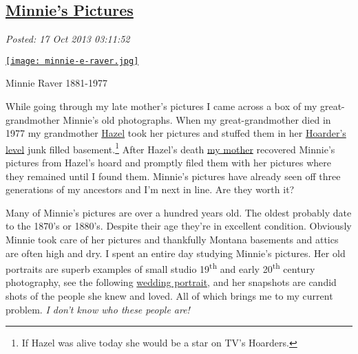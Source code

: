 %

\subsection*{\href{http://bakerjd99.wordpress.com/2013/10/16/minnies-pictures/}{Minnie's Pictures}}


\noindent\emph{Posted: 17 Oct 2013 03:11:52}
\vspace{6pt}



\captionsetup[floatingfigure]{labelformat=empty}
\begin{floatingfigure}[l]{0.29\textwidth}
\centering
\href{http://conceptcontrol.smugmug.com/People/Minnie-Raver/i-k6pnSJ4/A}{\texttt{[image: minnie-e-raver.jpg]}}
\caption{Minnie Raver 1881-1977}
\label{fig:4230X0}
\end{floatingfigure} While going through my late mother's pictures I came across a box of my
great-grandmother Minnie's old photographs. When my great-grandmother
died in 1977 my grandmother
\href{http://conceptcontrol.smugmug.com/People/Grandparents-1/i-PBjmr7p/A}{Hazel}
took her pictures and stuffed them in her
\href{http://www.aetv.com/hoarders/}{Hoarder's level} junk filled
basement.\footnote{
If Hazel was alive today she would be a star on TV's Hoarders.
} After Hazel's death
\href{http://conceptcontrol.smugmug.com/People/The-Way-We-Were/i-Z64DmrR/A}{my
mother} recovered Minnie's pictures from Hazel's hoard and promptly
filed them with her pictures where they remained until I found them.
Minnie's pictures have already seen off three generations of my
ancestors and I'm next in line. Are they worth it?

Many of Minnie's pictures are over a hundred years old. The oldest
probably date to the 1870's or 1880's. Despite their age they're in
excellent condition. Obviously Minnie took care of her pictures and
thankfully Montana basements and attics are often high and dry. I spent
an entire day studying Minnie's pictures. Her old portraits are superb
examples of small studio 19\textsuperscript{th} and early
20\textsuperscript{th} century photography, see the following
\href{https://familysearch.org/pal:/MM9.1.1/F3SR-Q8S}{wedding portrait},
and her snapshots are candid shots of the people she knew and loved. All
of which brings me to my current problem. \emph{I don't know who these
people are!}


